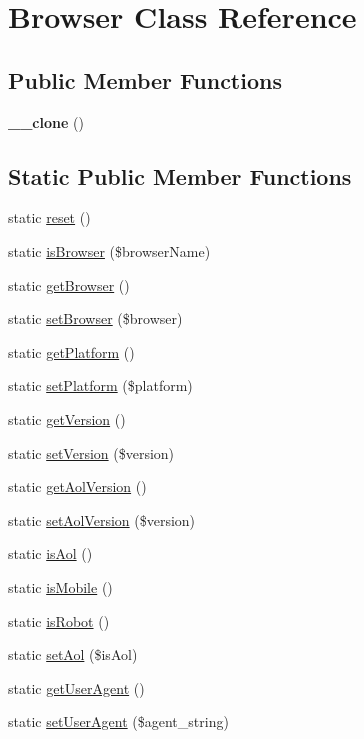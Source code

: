 \hypertarget{class_browser}{
\section{Browser Class Reference}
\label{class_browser}
}
\subsection*{Public Member Functions}
\begin{DoxyCompactItemize}
\item 
\hypertarget{class_browser_ad0cb87b388bc74d63dc884accdca8713}{
{\bfseries \_\-\_\-clone} ()}
\label{class_browser_ad0cb87b388bc74d63dc884accdca8713}

\end{DoxyCompactItemize}
\subsection*{Static Public Member Functions}
\begin{DoxyCompactItemize}
\item 
static \hyperlink{class_browser_a2325df26721fdbe820d577d2482725f8}{reset} ()
\item 
static \hyperlink{class_browser_aca06e61048fa1a697f85ccde8bb8bbf9}{isBrowser} (\$browserName)
\item 
static \hyperlink{class_browser_a047dea78fc2515e0f9c780f193c9d805}{getBrowser} ()
\item 
static \hyperlink{class_browser_a736afc45ea23edf12a40603813b70760}{setBrowser} (\$browser)
\item 
static \hyperlink{class_browser_a267b6591d2be5f3dc98135fc18c1fe14}{getPlatform} ()
\item 
static \hyperlink{class_browser_a2ea2161765b2cb4247eb12976dbf0371}{setPlatform} (\$platform)
\item 
static \hyperlink{class_browser_a173368ef6c164eee16c7cf59f5e83510}{getVersion} ()
\item 
static \hyperlink{class_browser_a805e476ef74adf8f37afd50a6c875fc8}{setVersion} (\$version)
\item 
static \hyperlink{class_browser_ab38615f9ba47adf119b6c4f0f9d50a06}{getAolVersion} ()
\item 
static \hyperlink{class_browser_a380f121effd088d9a1f37b4933526df6}{setAolVersion} (\$version)
\item 
static \hyperlink{class_browser_aa89b3df6eae98c42ff36b6e1e4a1fd74}{isAol} ()
\item 
static \hyperlink{class_browser_af18fc91684720f67c66e9c92a38f8bb8}{isMobile} ()
\item 
static \hyperlink{class_browser_ad5319088f8332844bf4e61ae092aab51}{isRobot} ()
\item 
static \hyperlink{class_browser_ae49e4bb4fb91e480df0f41cd5726a927}{setAol} (\$isAol)
\item 
static \hyperlink{class_browser_a4ab012f7eec74fa4b82c0557bcf1f1f1}{getUserAgent} ()
\item 
static \hyperlink{class_browser_a57c6e9710a5133e5e0141c12c04ba29d}{setUserAgent} (\$agent\_\-string)
\end{DoxyCompactItemize}
